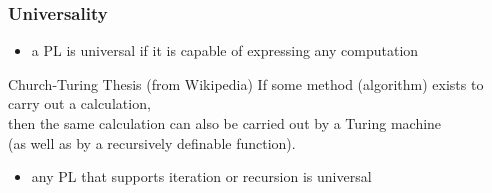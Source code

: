 \documentclass[dvipsnames]{beamer}
\theoremstyle{plain}
\begin{document}
\begin{frame}
  \frametitle{Universality}

  \begin{itemize}
    \item a PL is \alert{universal}
      if it is capable of expressing any computation
  \end{itemize}

  \pause
  \begin{block}{Church-Turing Thesis (from Wikipedia)}
    If some method (algorithm) exists to carry out a calculation,\\
    then the same calculation can also be carried out by a Turing machine\\
    (as well as by a recursively definable function).
  \end{block}

  \pause
  \begin{itemize}
    \item any PL that supports iteration or recursion is universal
  \end{itemize}
\end{frame}
\end{document}
